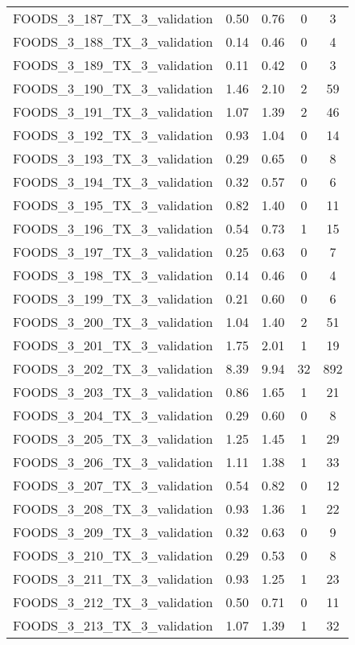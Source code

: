 \begin{table}
\begin{tabular}{|l|c|c|c|c|}
FOODS\_3\_187\_TX\_3\_validation & 0.50 & 0.76 & 0 & 3 \\
FOODS\_3\_188\_TX\_3\_validation & 0.14 & 0.46 & 0 & 4 \\
FOODS\_3\_189\_TX\_3\_validation & 0.11 & 0.42 & 0 & 3 \\
FOODS\_3\_190\_TX\_3\_validation & 1.46 & 2.10 & 2 & 59 \\
FOODS\_3\_191\_TX\_3\_validation & 1.07 & 1.39 & 2 & 46 \\
FOODS\_3\_192\_TX\_3\_validation & 0.93 & 1.04 & 0 & 14 \\
FOODS\_3\_193\_TX\_3\_validation & 0.29 & 0.65 & 0 & 8 \\
FOODS\_3\_194\_TX\_3\_validation & 0.32 & 0.57 & 0 & 6 \\
FOODS\_3\_195\_TX\_3\_validation & 0.82 & 1.40 & 0 & 11 \\
FOODS\_3\_196\_TX\_3\_validation & 0.54 & 0.73 & 1 & 15 \\
FOODS\_3\_197\_TX\_3\_validation & 0.25 & 0.63 & 0 & 7 \\
FOODS\_3\_198\_TX\_3\_validation & 0.14 & 0.46 & 0 & 4 \\
FOODS\_3\_199\_TX\_3\_validation & 0.21 & 0.60 & 0 & 6 \\
FOODS\_3\_200\_TX\_3\_validation & 1.04 & 1.40 & 2 & 51 \\
FOODS\_3\_201\_TX\_3\_validation & 1.75 & 2.01 & 1 & 19 \\
FOODS\_3\_202\_TX\_3\_validation & 8.39 & 9.94 & 32 & 892 \\
FOODS\_3\_203\_TX\_3\_validation & 0.86 & 1.65 & 1 & 21 \\
FOODS\_3\_204\_TX\_3\_validation & 0.29 & 0.60 & 0 & 8 \\
FOODS\_3\_205\_TX\_3\_validation & 1.25 & 1.45 & 1 & 29 \\
FOODS\_3\_206\_TX\_3\_validation & 1.11 & 1.38 & 1 & 33 \\
FOODS\_3\_207\_TX\_3\_validation & 0.54 & 0.82 & 0 & 12 \\
FOODS\_3\_208\_TX\_3\_validation & 0.93 & 1.36 & 1 & 22 \\
FOODS\_3\_209\_TX\_3\_validation & 0.32 & 0.63 & 0 & 9 \\
FOODS\_3\_210\_TX\_3\_validation & 0.29 & 0.53 & 0 & 8 \\
FOODS\_3\_211\_TX\_3\_validation & 0.93 & 1.25 & 1 & 23 \\
FOODS\_3\_212\_TX\_3\_validation & 0.50 & 0.71 & 0 & 11 \\
FOODS\_3\_213\_TX\_3\_validation & 1.07 & 1.39 & 1 & 32 \\

\end{tabular}
\end{table}
